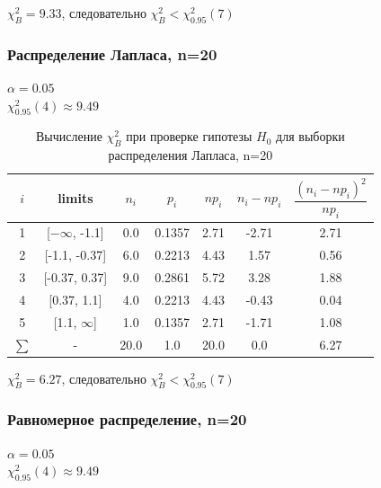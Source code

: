 $\chi_{B}^2 = 9.33$, следовательно  $\chi_{B}^2 <\chi^{2}_{0.95}(7)$ \\

\subsubsection{Распределение Лапласа, n=20}

$\alpha = 0.05$ \\
$\chi^{2}_{0.95}(4) \approx 9.49$ \\

\begin{table}[H]
	\begin{center}
		\begin{tabular}{|c|c|c|c|c|c|c|}
			\hline
			$i$ & limits & $n_i$ & $p_i$ & $np_i$ & $n_i - np_i$ & $\dfrac{(n_i-np_i)^2}{np_i}$ \\
			\hline
			1 & [$-\infty$, -1.1] & 0.0 & 0.1357 & 2.71 & -2.71 & 2.71 \\
			2 & [-1.1, -0.37] & 6.0 & 0.2213 & 4.43 & 1.57 & 0.56 \\
			3 & [-0.37, 0.37] & 9.0 & 0.2861 & 5.72 & 3.28 & 1.88 \\
			4 & [0.37, 1.1] & 4.0 & 0.2213 & 4.43 & -0.43 & 0.04 \\
			5 & [1.1, $\infty$] & 1.0 & 0.1357 & 2.71 & -1.71 & 1.08 \\
			\hline
			$\sum$ & - & 20.0 & 1.0 & 20.0 & 0.0 & 6.27\\
			\hline
		\end{tabular}
	\end{center}
	\caption{Вычисление $\chi_{B}^2$ при проверке гипотезы $H_0$ для выборки распределения Лапласа, n=20}
\end{table}

$\chi_{B}^2 = 6.27$, следовательно  $\chi_{B}^2 <\chi^{2}_{0.95}(7)$ \\
\subsubsection{Равномерное распределение, n=20}

$\alpha = 0.05$ \\
$\chi^{2}_{0.95}(4) \approx 9.49$ \\

